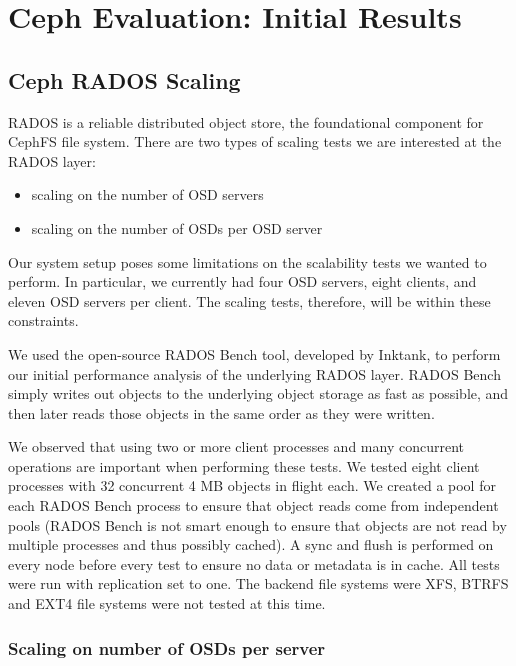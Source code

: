\section{Ceph Evaluation: Initial Results}
\label{sec:ceph-initial}

\subsection{Ceph RADOS Scaling}


RADOS is a reliable distributed object store, the foundational component for
CephFS file system. There are two types of scaling tests we are interested at
the RADOS layer:

\begin{itemize}
  \item scaling on the number of OSD servers
  \item scaling on the number of OSDs per OSD server
\end{itemize}

Our system setup poses some limitations on the scalability tests we wanted to
perform. In particular, we currently had four OSD servers, eight clients, and
eleven OSD servers per client. The scaling tests, therefore, will be within
these constraints.

We used the open-source RADOS Bench tool, developed by Inktank, to perform our
initial performance analysis of the underlying RADOS layer.  RADOS Bench simply
writes out objects to the underlying object storage as fast as possible, and
then later reads those objects in the same order as they were written.

We observed that using two or more client processes and many concurrent
operations are important when performing these tests.  We tested eight client processes 
with 32 concurrent 4 MB objects in flight each. We created a pool for
each RADOS Bench process to ensure that object reads come from independent pools
(RADOS Bench is not smart enough to ensure that objects are not read by multiple
processes and thus possibly cached).  A sync and flush is performed on every
node before every test to ensure no data or metadata is in cache.  All tests
were run with replication set to one.  The backend file systems were XFS,
BTRFS and EXT4 file systems were not tested at this time.


\subsubsection{Scaling on number of OSDs per server}


